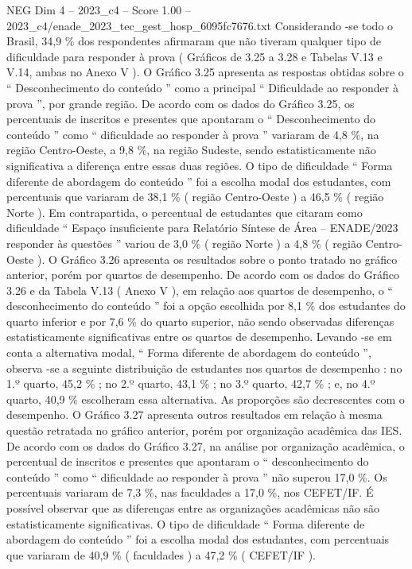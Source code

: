 \begin{textsample}{NEG Dim 4 – 2023\_c4 – Score 1.00 – 2023\_c4/enade\_2023\_tec\_gest\_hosp\_6095fc7676.txt}
Considerando -se todo o Brasil, 34,9 \% dos respondentes afirmaram que não tiveram qualquer tipo de dificuldade para responder à prova ( Gráficos de 3.25 a 3.28 e Tabelas V.13 e V.14, ambas no Anexo V ).
O Gráfico 3.25 apresenta as respostas obtidas sobre o “ Desconhecimento do conteúdo ” como a principal “ Dificuldade ao responder à prova ”, por grande região.
De acordo com os dados do Gráfico 3.25, os percentuais de inscritos e presentes que apontaram o “ Desconhecimento do conteúdo ” como “ dificuldade ao responder à prova ” variaram de 4,8 \%, na região Centro-Oeste, a 9,8 \%, na região Sudeste, sendo estatisticamente não significativa a diferença entre essas duas regiões.
O tipo de dificuldade “ Forma diferente de abordagem do conteúdo ” foi a escolha modal dos estudantes, com percentuais que variaram de 38,1 \% ( região Centro-Oeste ) a 46,5 \% ( região Norte ).
Em contrapartida, o percentual de estudantes que citaram como dificuldade “ Espaço insuficiente para Relatório Síntese de Área – ENADE/2023 responder às questões ” variou de 3,0 \% ( região Norte ) a 4,8 \% ( região Centro-Oeste ).
O Gráfico 3.26 apresenta os resultados sobre o ponto tratado no gráfico anterior, porém por quartos de desempenho.
De acordo com os dados do Gráfico 3.26 e da Tabela V.13 ( Anexo V ), em relação aos quartos de desempenho, o “ desconhecimento do conteúdo ” foi a opção escolhida por 8,1 \% dos estudantes do quarto inferior e por 7,6 \% do quarto superior, não sendo observadas diferenças estatisticamente significativas entre os quartos de desempenho.
Levando -se em conta a alternativa modal, “ Forma diferente de abordagem do conteúdo ”, observa -se a seguinte distribuição de estudantes nos quartos de desempenho : no 1.º quarto, 45,2 \% ; no 2.º quarto, 43,1 \% ; no 3.º quarto, 42,7 \% ; e, no 4.º quarto, 40,9 \% escolheram essa alternativa.
As proporções são decrescentes com o desempenho.
O Gráfico 3.27 apresenta outros resultados em relação à mesma questão retratada no gráfico anterior, porém por organização acadêmica das IES.
De acordo com os dados do Gráfico 3.27, na análise por organização acadêmica, o percentual de inscritos e presentes que apontaram o “ desconhecimento do conteúdo ” como “ dificuldade ao responder à prova ” não superou 17,0 \%.
Os percentuais variaram de 7,3 \%, nas faculdades a 17,0 \%, nos CEFET/IF.
É possível observar que as diferenças entre as organizações acadêmicas não são estatisticamente significativas.
O tipo de dificuldade “ Forma diferente de abordagem do conteúdo ” foi a escolha modal dos estudantes, com percentuais que variaram de 40,9 \% ( faculdades ) a 47,2 \% ( CEFET/IF ).

\end{textsample}
